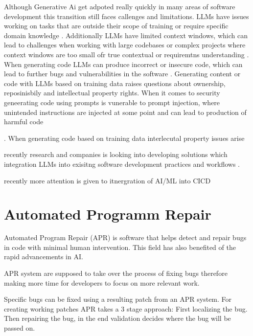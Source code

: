 Although Generative Ai get adpoted really quickly in many areas of software development this transition still faces callenges and limitations.
LLMs have issues working on tasks that are outside their scope of training or require specific domain knowledge \cite{houLargeLanguageModels2024}.
Additionally LLMs have limited context windows, which can lead to challenges when working with large codebases or complex projects where context windows are too small ofr true contextual or requiremtns understanding \cite{bhargavmallampatiRoleGenerativeAI2025}.
When generating code LLMs can produce incorrect or insecure code, which can lead to further bugs and vulnerabilities in the software \cite{houLargeLanguageModels2024}.
Generating content or code with LLMs based on training data raises questions about ownership, reposinisbily and intellectual property rights.
When it comes to security geneerating code using prompts is vunerable to prompt injection, where unintended instructions are injected at some point and can lead to production of harmful code \cite{}

\cite{bhargavmallampatiRoleGenerativeAI2025, houLargeLanguageModels2024}.
When generating code based on training data interlecutal property issues arise  \cite{sauvolaFutureSoftwareDevelopment2024}


recently research and companies is looking into developing solutions which integration LLMs into exisitng software development practices and workflows  \cite{puvvadiCodingAgentsComprehensive2025, dohmkeGitHubCopilotMeet2025, ntroducingCodex, sauvolaFutureSoftwareDevelopment2024}.

recently more attention is given to itnergration of AI/ML into CICD
\cite{mohammedAIDrivenContinuousIntegration2024}

\section{Automated Programm Repair}

Automated Program Repair (APR) is software that helps detect and repair bugs in code with minimal human intervention. This field has also benefited of the rapid advancements in AI.

APR system are supposed to take over the process of fixing bugs therefore making more time for developers to focus on more relevant work. \cite{houLargeLanguageModels2024}

Specific bugs can be fixed using a resulting patch from an APR system. For creating working patches APR takes a 3 stage approach: First localizing the bug. Then repairing the bug, in the end validation decides where the bug will be passed on.\cite{}

